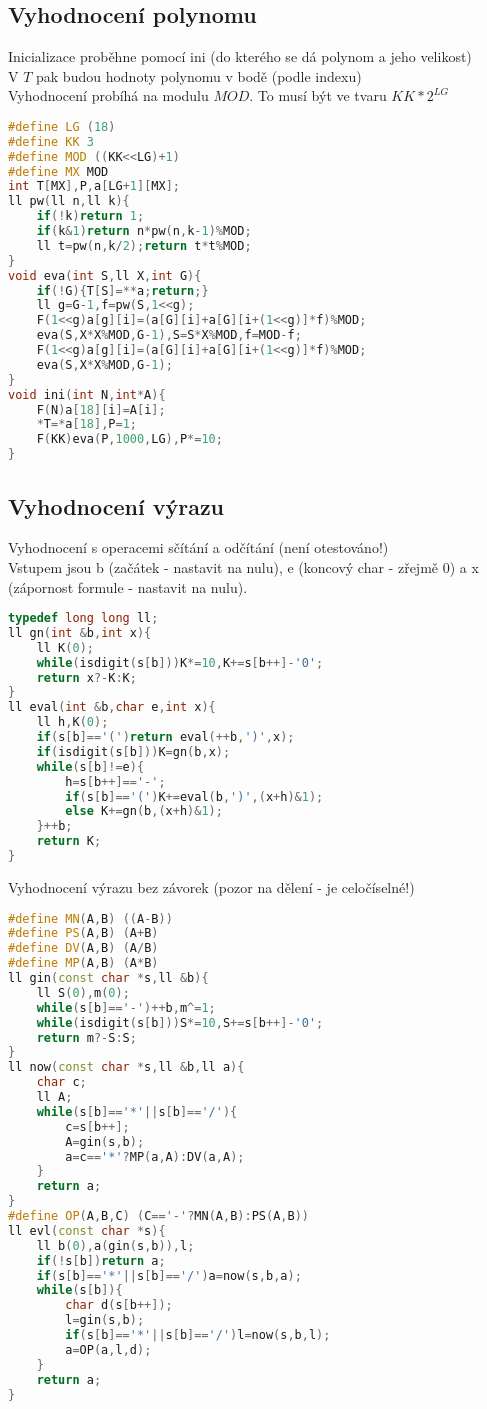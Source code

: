 \documentclass[11pt]{article}
\begin{document}
\subsection{Vyhodnocení polynomu}
Inicializace proběhne pomocí ini (do kterého se dá polynom a jeho velikost)
\\V $T$ pak budou hodnoty polynomu v bodě (podle indexu)
\\Vyhodnocení probíhá na modulu $MOD$. To musí být ve tvaru $KK*2^{LG}$
\begin{lstlisting}[language=C++]
#define LG (18)
#define KK 3
#define MOD ((KK<<LG)+1)
#define MX MOD
int T[MX],P,a[LG+1][MX];
ll pw(ll n,ll k){
    if(!k)return 1;
    if(k&1)return n*pw(n,k-1)%MOD;
    ll t=pw(n,k/2);return t*t%MOD;
}
void eva(int S,ll X,int G){
    if(!G){T[S]=**a;return;}
    ll g=G-1,f=pw(S,1<<g);
    F(1<<g)a[g][i]=(a[G][i]+a[G][i+(1<<g)]*f)%MOD;
    eva(S,X*X%MOD,G-1),S=S*X%MOD,f=MOD-f;
    F(1<<g)a[g][i]=(a[G][i]+a[G][i+(1<<g)]*f)%MOD;
    eva(S,X*X%MOD,G-1);
}
void ini(int N,int*A){
    F(N)a[18][i]=A[i];
    *T=*a[18],P=1;
    F(KK)eva(P,1000,LG),P*=10;
}
\end{lstlisting}
\subsection{Vyhodnocení výrazu}
Vyhodnocení s operacemi sčítání a odčítání (není otestováno!)
\\Vstupem jsou \textsf{b} (začátek - nastavit na nulu), \textsf{e} (koncový char - zřejmě 0) a \textsf{x} (zápornost formule - nastavit na nulu).
\begin{lstlisting}[language=C++]
typedef long long ll;
ll gn(int &b,int x){
    ll K(0);
    while(isdigit(s[b]))K*=10,K+=s[b++]-'0';
    return x?-K:K;
}
ll eval(int &b,char e,int x){
    ll h,K(0);
    if(s[b]=='(')return eval(++b,')',x);
    if(isdigit(s[b]))K=gn(b,x);
    while(s[b]!=e){
        h=s[b++]=='-';
        if(s[b]=='(')K+=eval(b,')',(x+h)&1);
        else K+=gn(b,(x+h)&1);
    }++b;
    return K;
}
\end{lstlisting}
Vyhodnocení výrazu bez závorek (pozor na dělení - je celočíselné!)
\begin{lstlisting}[language=C++]
#define MN(A,B) ((A-B))
#define PS(A,B) (A+B)
#define DV(A,B) (A/B)
#define MP(A,B) (A*B)
ll gin(const char *s,ll &b){
    ll S(0),m(0);
    while(s[b]=='-')++b,m^=1;
    while(isdigit(s[b]))S*=10,S+=s[b++]-'0';
    return m?-S:S;
}
ll now(const char *s,ll &b,ll a){
    char c;
    ll A;
    while(s[b]=='*'||s[b]=='/'){
        c=s[b++];
        A=gin(s,b);
        a=c=='*'?MP(a,A):DV(a,A);
    }
    return a;
}
#define OP(A,B,C) (C=='-'?MN(A,B):PS(A,B))
ll evl(const char *s){
    ll b(0),a(gin(s,b)),l;
    if(!s[b])return a;
    if(s[b]=='*'||s[b]=='/')a=now(s,b,a);
    while(s[b]){
        char d(s[b++]);
        l=gin(s,b);
        if(s[b]=='*'||s[b]=='/')l=now(s,b,l);
        a=OP(a,l,d);
    }
    return a;
}
\end{lstlisting}
\end{document}
